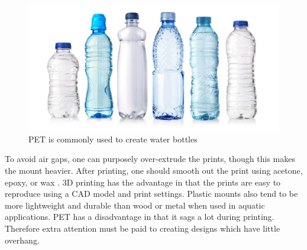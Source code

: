 \begin{figure}[h]
\centering
\includegraphics[scale=0.2]{uav/31_pet.jpg}
\caption{PET is commonly used to create water bottles \cite{petbottle}}
\end{figure}

To avoid air gaps, one can purposely over-extrude the prints, though this makes the mount heavier. After printing, one should smooth out the print using acetone, epoxy, or wax \cite{waterproof3d}. 3D printing has the advantage in that the prints are easy to reproduce using a CAD model and print settings. Plastic mounts also tend to be more lightweight and durable than wood or metal when used in aquatic applications. PET has a disadvantage in that it sags a lot during printing. Therefore extra attention must be paid to creating designs which have little overhang.  \cite{overhang}